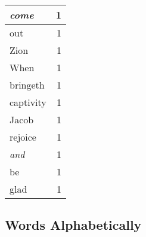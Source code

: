 \begin{center}
\begin{longtable}{l|r}
\emph{come} & 1 \\ \hline
out & 1 \\ \hline
Zion & 1 \\ \hline
When & 1 \\ \hline
bringeth & 1 \\ \hline
captivity & 1 \\ \hline
Jacob & 1 \\ \hline
rejoice & 1 \\ \hline
\emph{and} & 1 \\ \hline
be & 1 \\ \hline
glad & 1 \\ \hline
\end{longtable}
\end{center}



\normalsize



\subsection{Words Alphabetically}

